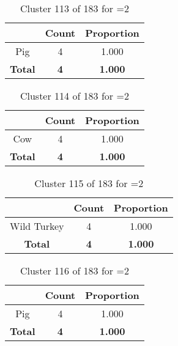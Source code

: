 \begin{table}[ht!]
\centering
\begin{tabular}{|c|c|c|}
\hline
\bf \Spec{} &\bf Count &\bf Proportion\\ \hline \hline
Pig & 4 & 1.000\\ \hline
\hline
\bf Total & \bf 4 & \bf 1.000\\ \hline
\end{tabular}
\label{tab:cluster:113:2}
\caption{Cluster 113 of 183 for \minneigh{}=2}
\end{table}

\begin{table}[ht!]
\centering
\begin{tabular}{|c|c|c|}
\hline
\bf \Spec{} &\bf Count &\bf Proportion\\ \hline \hline
Cow & 4 & 1.000\\ \hline
\hline
\bf Total & \bf 4 & \bf 1.000\\ \hline
\end{tabular}
\label{tab:cluster:114:2}
\caption{Cluster 114 of 183 for \minneigh{}=2}
\end{table}

\begin{table}[ht!]
\centering
\begin{tabular}{|c|c|c|}
\hline
\bf \Spec{} &\bf Count &\bf Proportion\\ \hline \hline
Wild Turkey & 4 & 1.000\\ \hline
\hline
\bf Total & \bf 4 & \bf 1.000\\ \hline
\end{tabular}
\label{tab:cluster:115:2}
\caption{Cluster 115 of 183 for \minneigh{}=2}
\end{table}

\begin{table}[ht!]
\centering
\begin{tabular}{|c|c|c|}
\hline
\bf \Spec{} &\bf Count &\bf Proportion\\ \hline \hline
Pig & 4 & 1.000\\ \hline
\hline
\bf Total & \bf 4 & \bf 1.000\\ \hline
\end{tabular}
\label{tab:cluster:116:2}
\caption{Cluster 116 of 183 for \minneigh{}=2}
\end{table}


